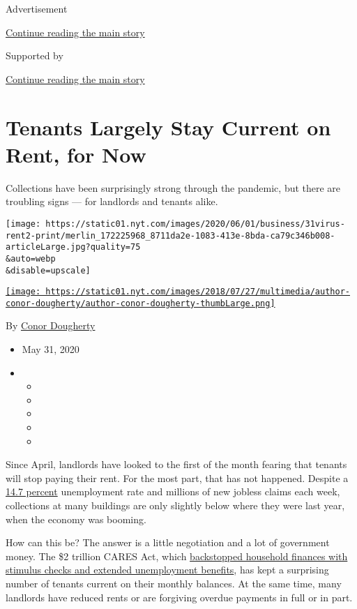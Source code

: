 Advertisement

\protect\hyperlink{after-top}{Continue reading the main story}

Supported by

\protect\hyperlink{after-sponsor}{Continue reading the main story}

\hypertarget{tenants-largely-stay-current-on-rent-for-now}{%
\section{Tenants Largely Stay Current on Rent, for
Now}\label{tenants-largely-stay-current-on-rent-for-now}}

Collections have been surprisingly strong through the pandemic, but
there are troubling signs --- for landlords and tenants alike.

\texttt{[image: https://static01.nyt.com/images/2020/06/01/business/31virus-rent2-print/merlin\_172225968\_8711da2e-1083-413e-8bda-ca79c346b008-articleLarge.jpg?quality=75\\\&auto=webp\\\&disable=upscale]}

\href{https://www.nytimes.com/by/conor-dougherty}{\texttt{[image: https://static01.nyt.com/images/2018/07/27/multimedia/author-conor-dougherty/author-conor-dougherty-thumbLarge.png]}}

By \href{https://www.nytimes.com/by/conor-dougherty}{Conor Dougherty}

\begin{itemize}
\item
  May 31, 2020
\item
  \begin{itemize}
  \item
  \item
  \item
  \item
  \item
  \end{itemize}
\end{itemize}

Since April, landlords have looked to the first of the month fearing
that tenants will stop paying their rent. For the most part, that has
not happened. Despite a
\href{https://www.nytimes.com/interactive/2020/05/08/business/economy/april-jobs-report.html}{14.7
percent} unemployment rate and millions of new jobless claims each week,
collections at many buildings are only slightly below where they were
last year, when the economy was booming.

How can this be? The answer is a little negotiation and a lot of
government money. The \$2 trillion CARES Act, which
\href{https://www.nytimes.com/2020/05/28/business/economy/coronavirus-stimulus-unemployment.html}{backstopped
household finances with stimulus checks and extended unemployment
benefits}, has kept a surprising number of tenants current on their
monthly balances. At the same time, many landlords have reduced rents or
are forgiving overdue payments in full or in part.

